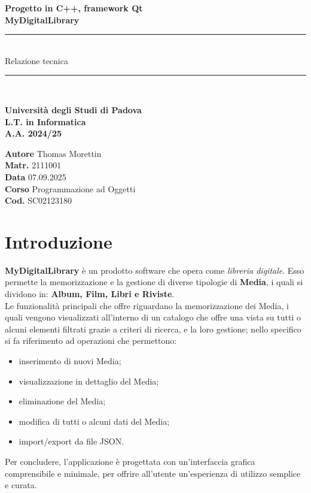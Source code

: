 \documentclass[a4paper,10pt]{article}
\begin{document}
	
	\begin{titlepage}
		\centering
		\vspace*{\fill}
		{\huge \textbf{Progetto in C++, framework Qt}}\\[0.5cm]
		{\Huge \textbf{MyDigitalLibrary}}\\[1.5cm]
		
		\rule{\textwidth}{0.5pt}\\[0.4cm] %
		{\LARGE Relazione tecnica}\\[0.1cm]
		\rule{\textwidth}{0.5pt}\\[2cm]
		
		\begin{flushright}
		{\Large \textbf{Università degli Studi di Padova}} \\[0.1cm]
		{\Large \textbf{L.T. in Informatica}} \\[0.1cm]
		{\Large \textbf{A.A. 2024/25}} \\[0.5cm]
		\end{flushright}
		
		\begin{flushleft}
			\textbf{Autore} Thomas Morettin \\
			\textbf{\hspace*{0.5cm}Matr.} 2111001 \\[0.5cm]
			\textbf{Data} 07.09.2025 \\
			\textbf{Corso} Programmazione ad Oggetti \\
			\textbf{\hspace*{0.5cm}Cod.} SC02123180 \\
		\end{flushleft}
		\vspace*{\fill}
	\end{titlepage}
	\tableofcontents
	\clearpage
	
	\section{Introduzione}
	\textbf{MyDigitalLibrary} è un prodotto software che opera come \textit{libreria digitale}. Esso permette la memorizzazione e la gestione di diverse tipologie di \textbf{Media}, i quali si dividono in: \textbf{Album, Film, Libri e Riviste}.\\ Le funzionalità principali che offre riguardano la memorizzazione dei Media, i quali vengono visualizzati all'interno di un catalogo che offre una vista su tutti o alcuni elementi filtrati grazie a criteri di ricerca, e la loro gestione; nello specifico si fa riferimento ad operazioni che permettono:
	\begin{itemize}
		\item inserimento di nuovi Media;
		\item visualizzazione in dettaglio del Media;
		\item eliminazione del Media;
		\item modifica di tutti o alcuni dati del Media;
		\item import/export da file JSON.
	\end{itemize}
	Per concludere, l'applicazione è progettata con un'interfaccia grafica comprensibile e minimale, per offrire all'utente un'esperienza di utilizzo semplice e curata.
	
\end{document}
